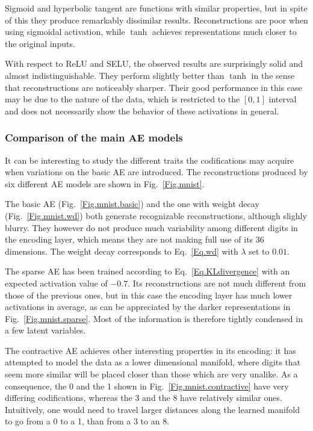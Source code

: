 \documentclass[preprint,5p,compress]{elsarticle}
\begin{document}
Sigmoid and hyperbolic tangent are functions with similar properties, but in spite of this they produce remarkably dissimilar results. Reconstructions are poor when using sigmoidal activation, while $\tanh$ achieves representations much closer to the original inputs.

With respect to ReLU and SELU, the observed results are surprisingly solid and almost indistinguishable. They perform slightly better than $\tanh$ in the sense that reconstructions are noticeably sharper. Their good performance in this case may be due to the nature of the data, which is restricted to the $[0,1]$ interval and does not necessarily show the behavior of these activations in general.


\subsubsection{Comparison of the main AE models}\label{Sec.case.models}

It can be interesting to study the different traits the codifications may acquire when variations on the basic AE are introduced. The reconstructions produced by six different AE models are shown in Fig.~\ref{Fig.mnist}. 

The basic AE (Fig.~\ref{Fig.mnist.basic}) and the one with weight decay (Fig.~\ref{Fig.mnist.wd}) both generate recognizable reconstructions, although slighly blurry. They however do not produce much variability among different digits in the encoding layer, which means they are not making full use of its 36 dimensions. The weight decay corresponds to Eq.~\ref{Eq.wd} with $\lambda$ set to $0.01$.

The sparse AE has been trained according to Eq.~\ref{Eq.KLdivergence} with an expected activation value of $-0.7$. Its reconstructions are not much different from those of the previous ones, but in this case the encoding layer has much lower activations in average, as can be appreciated by the darker representations in  Fig.~\ref{Fig.mnist.sparse}. Most of the information is therefore tightly condensed in a few latent variables.

The contractive AE achieves other interesting properties in its encoding: it has attempted to model the data as a lower dimensional manifold, where digits that seem more similar will be placed closer than those which are very unalike. As a consequence, the 0 and the 1 shown in Fig.~\ref{Fig.mnist.contractive} have very differing codifications, whereas the 3 and the 8 have relatively similar ones. Intuitively, one would need to travel larger distances along the learned manifold to go from a 0 to a 1, than from a 3 to an 8.
\end{document}
